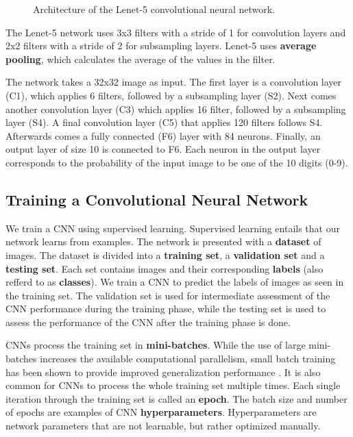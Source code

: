 \begin{figure}[H]
\centering
{}
\caption[Architecture of the Lenet-5 convolutional neural network.]{Architecture of the Lenet-5 convolutional neural network.\cite{lecun1989backpropagation}}
\label{fig:lenet5}
\end{figure}

The Lenet-5 network uses 3x3 filters with a stride of 1 for convolution layers and 2x2 filters with a stride of 2 for subsampling layers. Lenet-5 uses \textbf{average pooling}, which calculates the average of the values in the filter.

The network takes a 32x32 image as input. The first layer is a convolution layer (C1), which applies 6 filters, followed by a subsampling layer (S2). Next comes another convolution layer (C3) which applies 16 filter, followed by a subsampling layer (S4). A final convolution layer (C5) that applies 120 filters follows S4. Afterwards comes a fully connected (F6) layer with 84 neurons. Finally, an output layer of size 10 is connected to F6. Each neuron in the output layer corresponds to the probability of the input image to be one of the 10 digits (0-9).

\subsection{Training a Convolutional Neural Network}
We train a CNN using supervised learning. Supervised learning entails that our network learns from examples. The network is presented with a \textbf{dataset} of images. The dataset is divided into a \textbf{training set}, a \textbf{validation set} and a \textbf{testing set}. Each set contains images and their corresponding \textbf{labels} (also refferd to as \textbf{classes}). We train a CNN to predict the labels of images as seen in the training set. The validation set is used for intermediate assessment of the CNN performance during the training phase, while the testing set is used to assess the performance of the CNN after the training phase is done.

CNNs process the training set in \textbf{mini-batches}. While the use of large mini-batches increases the available computational parallelism, small batch training has been shown to provide improved generalization performance \cite{masters2018revisiting}. It is also common for CNNs to process the whole training set multiple times. Each single iteration through the training set is called an \textbf{epoch}. The batch size and number of epochs are examples of CNN \textbf{hyperparameters}. Hyperparameters are network parameters that are not learnable, but rather optimized manually.

